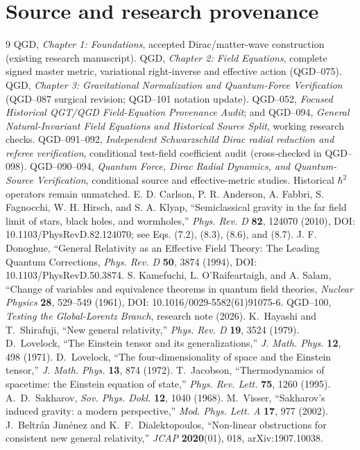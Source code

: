 \documentclass[11pt,a4paper]{article}
\begin{document}
\section*{Source and research provenance}
\begin{thebibliography}{9}
 QGD, \emph{Chapter 1: Foundations}, accepted Dirac/matter-wave construction (existing research manuscript).
 QGD, \emph{Chapter 2: Field Equations}, complete signed master metric, variational right-inverse and effective action (QGD--075).
 QGD, \emph{Chapter 3: Gravitational Normalization and Quantum-Force Verification} (QGD--087 surgical revision; QGD--101 notation update).
 QGD--052, \emph{Focused Historical QGT/QGD Field-Equation Provenance Audit}; and QGD--094, \emph{General Natural-Invariant Field Equations and Historical Source Split}, working research checks.
 QGD--091--092, \emph{Independent Schwarzschild Dirac radial reduction and referee verification}, conditional test-field coefficient audit (cross-checked in QGD--098).
 QGD--090--094, \emph{Quantum Force, Dirac Radial Dynamics, and Quantum-Source Verification}, conditional source and effective-metric studies. Historical $\hbar^2$ operators remain unmatched.
 E. D. Carlson, P. R. Anderson, A. Fabbri, S. Fagnocchi, W. H. Hirsch, and S. A. Klyap, ``Semiclassical gravity in the far field limit of stars, black holes, and wormholes,'' \emph{Phys. Rev. D} \textbf{82}, 124070 (2010), DOI: 10.1103/PhysRevD.82.124070; see Eqs. (7.2), (8.3), (8.6), and (8.7).
 J. F. Donoghue, ``General Relativity as an Effective Field Theory: The Leading Quantum Corrections, \emph{Phys. Rev. D} \textbf{50}, 3874 (1994), DOI: 10.1103/PhysRevD.50.3874.
 S. Kamefuchi, L. O\textquoteright Raifeartaigh, and A. Salam, ``Change of variables and equivalence theorems in quantum field theories, \emph{Nuclear Physics} \textbf{28}, 529--549 (1961), DOI: 10.1016/0029-5582(61)91075-6.
 QGD--100, \emph{Testing the Global-Lorentz Branch}, research note (2026).
 K.~Hayashi and T.~Shirafuji, ``New general relativity,'' \emph{Phys. Rev. D} \textbf{19}, 3524 (1979).
 D.~Lovelock, ``The Einstein tensor and its generalizations,'' \emph{J. Math. Phys.} \textbf{12}, 498 (1971).
 D.~Lovelock, ``The four-dimensionality of space and the Einstein tensor,'' \emph{J. Math. Phys.} \textbf{13}, 874 (1972).
 T.~Jacobson, ``Thermodynamics of spacetime: the Einstein equation of state,'' \emph{Phys. Rev. Lett.} \textbf{75}, 1260 (1995).
 A.~D.~Sakharov, \emph{Sov. Phys. Dokl.} \textbf{12}, 1040 (1968).
 M.~Visser, ``Sakharov's induced gravity: a modern perspective,'' \emph{Mod. Phys. Lett. A} \textbf{17}, 977 (2002).
 J.~Beltr\'an Jim\'enez and K.~F.~Dialektopoulos, ``Non-linear obstructions for consistent new general relativity,'' \emph{JCAP} \textbf{2020}(01), 018, arXiv:1907.10038.
\end{thebibliography}
\end{document}
